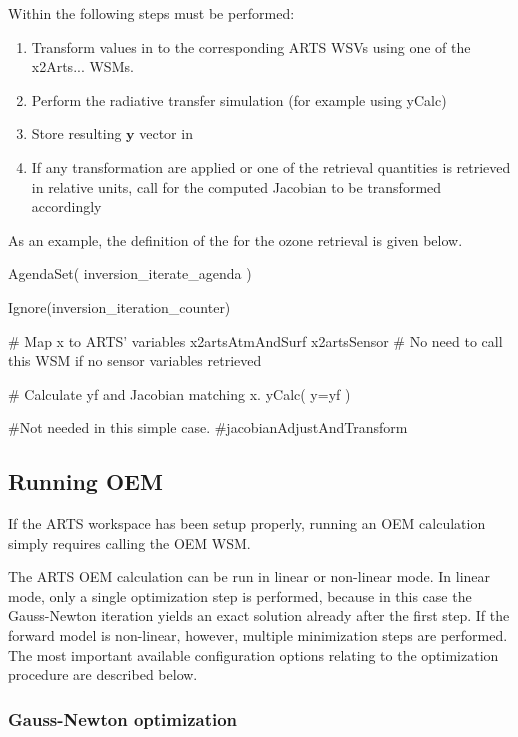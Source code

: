 Within   the following steps must be
performed:

\begin{enumerate}
\item Transform values in  to the corresponding
ARTS WSVs using one of the x2Arts... WSMs.
\item Perform the radiative transfer simulation (for example using
yCalc)
\item  Store resulting $\mathbf{y}$ vector in 
\item If any transformation are applied or one of the retrieval quantities
is retrieved in relative units, call
  for the computed Jacobian
to be transformed accordingly
\end{enumerate}

As an example, the definition of the 
for the ozone retrieval is given below.

\begin{code}
AgendaSet( inversion_iterate_agenda ){

  Ignore(inversion_iteration_counter)
    
  # Map x to ARTS' variables
  x2artsAtmAndSurf
  x2artsSensor   # No need to call this WSM if no sensor variables retrieved

  # Calculate yf and Jacobian matching x.
  yCalc( y=yf )

  #Not needed in this simple case.
  #jacobianAdjustAndTransform
}
\end{code}

\subsection{Running OEM}

If the ARTS workspace has been setup properly, running an OEM calculation
simply requires calling the OEM WSM. 

The ARTS OEM calculation can be run in linear or non-linear mode. In linear
mode, only a single optimization step is performed, because in this case 
the Gauss-Newton iteration yields an exact solution already after the
first step. If the forward model is non-linear, however,
 multiple minimization steps are performed. The most important available
configuration options relating to the optimization procedure are described
below.

\subsubsection{Gauss-Newton optimization}
\label{ref:oem:gn}

